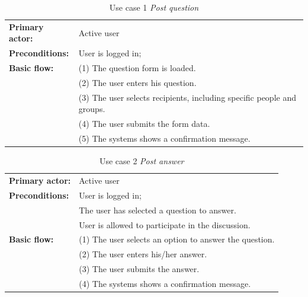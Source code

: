\begin{table}[ht]
\caption{Use case 1 \textit{Post question}}
\begin{center}
	\begin{tabular}{ l p{300px} }
		\hline
		\textbf{Primary actor:}	& Active user \\

		\textbf{Preconditions:}	& User is logged in; \\

		\textbf{Basic flow:}	& (1) The question form is loaded. \\
													& (2) The user enters his question. \\
													& (3) The user selects recipients, including specific people and groups. \\
													& (4) The user submits the form data. \\
													& (5) The systems shows a confirmation message. \\

		\hline
	\end{tabular}
\end{center}
\label{table:use_case1}
\end{table}


\begin{table}[ht]
\caption{Use case 2 \textit{Post answer}}
\begin{center}
	\begin{tabular}{ l p{300px} }
		\hline
		\textbf{Primary actor:}	& Active user \\

		\textbf{Preconditions:}	& User is logged in; \\
														& The user has selected a question to answer. \\
														& User is allowed to participate in the discussion. \\

		\textbf{Basic flow:}	& (1) The user selects an option to answer the question. \\
													& (2) The user enters his/her answer. \\
													& (3) The user submits the answer. \\
													& (4) The systems shows a confirmation message. \\

		\hline
	\end{tabular}
\end{center}
\label{table:use_case2}
\end{table}



